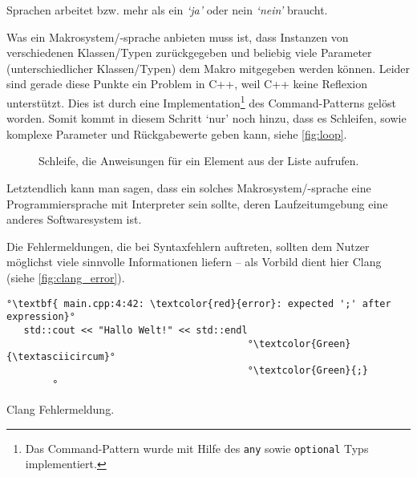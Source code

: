    Sprachen arbeitet bzw. mehr als ein \textit{`ja'} oder nein \textit{`nein'} braucht.

    Was ein Makrosystem/-sprache anbieten muss ist, dass Instanzen von verschiedenen Klassen/Typen zurückgegeben und beliebig viele Parameter (unterschiedlicher Klassen/Typen) dem Makro mitgegeben werden können. Leider sind gerade diese Punkte ein Problem in C++, weil C++ keine Reflexion\autocites{vinoski2005time}{ferber1989computational} unterstützt.
    Dies ist durch eine Implementation\footnote{
      Das Command-Pattern wurde mit Hilfe des \texttt{any} \autocite{cpp-fundamentals} sowie \texttt{optional} \autocite{cpp-fundamentals} Typs implementiert.
    }
    des Command-Patterns gelöst worden. %
    Somit kommt in diesem Schritt `nur' noch hinzu, dass es Schleifen, sowie komplexe Parameter und Rückgabewerte geben kann, siehe \autoref{fig:loop}.

    \begin{figure}[H]
      \centering
      \caption{Schleife, die Anweisungen für ein Element aus der Liste aufrufen.}
      \label{fig:loop}
    \end{figure}

    Letztendlich kann man sagen, dass ein solches Makrosystem/-sprache eine Programmiersprache mit Interpreter sein sollte, deren Laufzeitumgebung eine anderes Softwaresystem ist.

    Die Fehlermeldungen, die bei Syntaxfehlern auftreten, sollten dem Nutzer möglichst viele sinnvolle Informationen liefern -- als Vorbild dient hier Clang (siehe \autoref{fig:clang_error}).

    \begin{myCodeEnv}
      \centering
      \begin{minipage}{.9\textwidth}
        \begin{lstlisting}[keepspaces,escapechar=°,numbers=none]
°\textbf{ main.cpp:4:42: \textcolor{red}{error}: expected ';' after expression}°
   std::cout << "Hallo Welt!" << std::endl
                                          °\textcolor{Green}{\textasciicircum}°
                                          °\textcolor{Green}{;}
        °\end{lstlisting}
      \end{minipage}
      \caption{Clang Fehlermeldung.}
      \label{fig:clang_error}
    \end{myCodeEnv}

